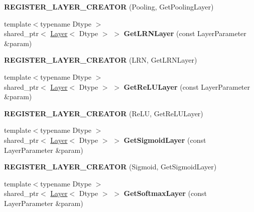\begin{DoxyCompactItemize}
\item 
{\bfseries R\+E\+G\+I\+S\+T\+E\+R\+\_\+\+L\+A\+Y\+E\+R\+\_\+\+C\+R\+E\+A\+T\+OR} (Pooling, Get\+Pooling\+Layer)\hypertarget{namespacecaffe_ae15dbd197521d5690de784adacd4351c}{}\label{namespacecaffe_ae15dbd197521d5690de784adacd4351c}

\item 
{\footnotesize template$<$typename Dtype $>$ }\\shared\+\_\+ptr$<$ \hyperlink{classcaffe_1_1Layer}{Layer}$<$ Dtype $>$ $>$ {\bfseries Get\+L\+R\+N\+Layer} (const Layer\+Parameter \&param)\hypertarget{namespacecaffe_a5d35f50f4dc6ff971fde340034f14f48}{}\label{namespacecaffe_a5d35f50f4dc6ff971fde340034f14f48}

\item 
{\bfseries R\+E\+G\+I\+S\+T\+E\+R\+\_\+\+L\+A\+Y\+E\+R\+\_\+\+C\+R\+E\+A\+T\+OR} (L\+RN, Get\+L\+R\+N\+Layer)\hypertarget{namespacecaffe_a8e71677619e9bda16a7db5ca8b1076b4}{}\label{namespacecaffe_a8e71677619e9bda16a7db5ca8b1076b4}

\item 
{\footnotesize template$<$typename Dtype $>$ }\\shared\+\_\+ptr$<$ \hyperlink{classcaffe_1_1Layer}{Layer}$<$ Dtype $>$ $>$ {\bfseries Get\+Re\+L\+U\+Layer} (const Layer\+Parameter \&param)\hypertarget{namespacecaffe_a324c8bc02e74a55534c5ee88e6091870}{}\label{namespacecaffe_a324c8bc02e74a55534c5ee88e6091870}

\item 
{\bfseries R\+E\+G\+I\+S\+T\+E\+R\+\_\+\+L\+A\+Y\+E\+R\+\_\+\+C\+R\+E\+A\+T\+OR} (Re\+LU, Get\+Re\+L\+U\+Layer)\hypertarget{namespacecaffe_a74137c7c08feb4989666f9c2893eecd1}{}\label{namespacecaffe_a74137c7c08feb4989666f9c2893eecd1}

\item 
{\footnotesize template$<$typename Dtype $>$ }\\shared\+\_\+ptr$<$ \hyperlink{classcaffe_1_1Layer}{Layer}$<$ Dtype $>$ $>$ {\bfseries Get\+Sigmoid\+Layer} (const Layer\+Parameter \&param)\hypertarget{namespacecaffe_a4f82d0f97b376edb7f08f6bcd34265fe}{}\label{namespacecaffe_a4f82d0f97b376edb7f08f6bcd34265fe}

\item 
{\bfseries R\+E\+G\+I\+S\+T\+E\+R\+\_\+\+L\+A\+Y\+E\+R\+\_\+\+C\+R\+E\+A\+T\+OR} (Sigmoid, Get\+Sigmoid\+Layer)\hypertarget{namespacecaffe_a6a0df9ece151ad9a5f57687e787f0050}{}\label{namespacecaffe_a6a0df9ece151ad9a5f57687e787f0050}

\item 
{\footnotesize template$<$typename Dtype $>$ }\\shared\+\_\+ptr$<$ \hyperlink{classcaffe_1_1Layer}{Layer}$<$ Dtype $>$ $>$ {\bfseries Get\+Softmax\+Layer} (const Layer\+Parameter \&param)\hypertarget{namespacecaffe_ab19a971cee1f99b4fdcaade75459d999}{}\label{namespacecaffe_ab19a971cee1f99b4fdcaade75459d999}


\end{DoxyCompactItemize}
